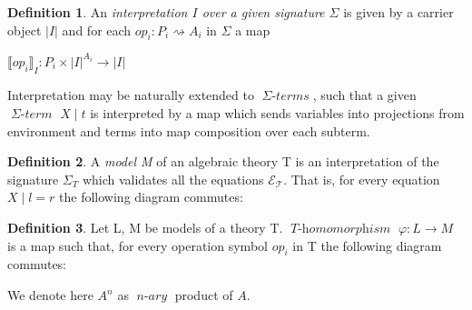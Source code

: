 \documentclass[declaration,shortabstract]{iithesis}
\theoremstyle{definition} \newtheorem{definition}{Definition}[chapter]
\theoremstyle{remark} \newtheorem{remark}[definition]{Observation}
\theoremstyle{plain} \newtheorem{theorem}[definition]{Theorem}
\theoremstyle{plain} \newtheorem{lemma}[definition]{Lemma}
\newcommand{\mathVar}[1]{{\operatorname{\mathit{#1}}}}
\begin{document}
    \begin{definition}

    An \textit{interpretation $I$ over a given signature $\Sigma$} is given by
    a carrier object $|I|$ and for each $ op_{i} : P_{i} \rightsquigarrow A_{i} $
    in $\Sigma$ a map

    \begin{center}
        $ {\llbracket op_{i} \rrbracket}_I : P_{i} \times{} {|I|}^{A_{i}} \rightarrow |I| $
    \end{center}

    \noindent
    Interpretation may be naturally extended to $\mathVar{\Sigma-terms}$, such
    that a given $\mathVar{\Sigma-term}$ $X \mid t$ is interpreted by a map
    which sends variables into projections from environment and terms into
    map composition over each subterm.

    \end{definition}

    \begin{definition}

    A \textit{model M} of an algebraic theory T is an interpretation of the
    signature ${\Sigma_{T}}$ which validates all the equations $\mathcal{E_{T}}$.
    That is, for every equation $X \mid l = r$ the following diagram commutes:

    \begin{center}
    \end{center}

    \end{definition}

    \begin{definition}

    Let L, M be models of a theory T. $ \mathVar{T-homomorphism}$
    $\varphi : L \rightarrow M$ is a map such that, for every operation symbol
    $op_{i}$ in T the following diagram commutes:

    \begin{center}
    \end{center}

    \noindent
    We denote here $A^{n}$ as $\mathVar{n-ary}$ product of $A$.

    \end{definition}
\end{document}
